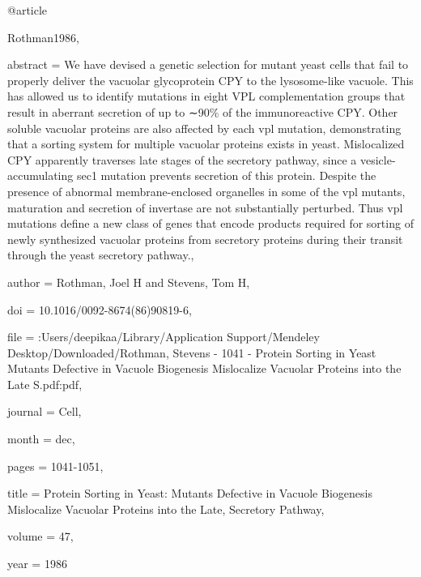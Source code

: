 @article{Rothman1986,

abstract = {We have devised a genetic selection for mutant yeast cells that fail to properly deliver the vacuolar glycoprotein CPY to the lysosome-like vacuole. This has allowed us to identify mutations in eight VPL complementation groups that result in aberrant secretion of up to ∼90\% of the immunoreactive CPY. Other soluble vacuolar proteins are also affected by each vpl mutation, demonstrating that a sorting system for multiple vacuolar proteins exists in yeast. Mislocalized CPY apparently traverses late stages of the secretory pathway, since a vesicle-accumulating sec1 mutation prevents secretion of this protein. Despite the presence of abnormal membrane-enclosed organelles in some of the vpl mutants, maturation and secretion of invertase are not substantially perturbed. Thus vpl mutations define a new class of genes that encode products required for sorting of newly synthesized vacuolar proteins from secretory proteins during their transit through the yeast secretory pathway.},

author = {Rothman, Joel H and Stevens, Tom H},

doi = {10.1016/0092-8674(86)90819-6},

file = {:Users/deepikaa/Library/Application Support/Mendeley Desktop/Downloaded/Rothman, Stevens - 1041 - Protein Sorting in Yeast Mutants Defective in Vacuole Biogenesis Mislocalize Vacuolar Proteins into the Late S.pdf:pdf},

journal = {Cell},

month = {dec},

pages = {1041-1051},

title = {{Protein Sorting in Yeast: Mutants Defective in Vacuole Biogenesis Mislocalize Vacuolar Proteins into the Late, Secretory Pathway}},

volume = {47},

year = {1986}

}

